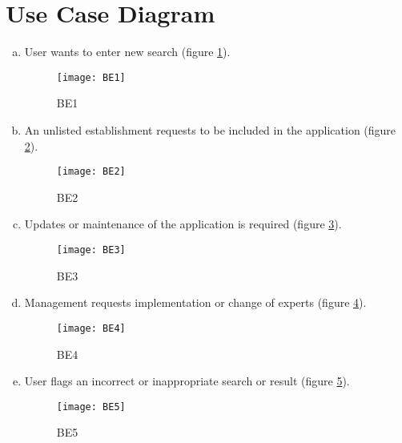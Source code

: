 \documentclass[titlepage]{article}
\begin{document}
\section{Use Case Diagram}
\label{sec:use_case_diagram}
\begin{enumerate}[a)]
	\item User wants to enter new search (figure \ref{usecase:search}).
	
	\begin{center}
		\begin{figure}[H]
			\texttt{[image: BE1]}
			\caption{BE1}\label{usecase:search}
		\end{figure}
	\end{center}

\item An unlisted establishment requests to be included in the application (figure \ref{usecase:new_esta}).
	
	\begin{center}
		\begin{figure}[H]
			\texttt{[image: BE2]}
			\caption{BE2}\label{usecase:new_esta}
		\end{figure}
	\end{center}

\item Updates or maintenance of the application is required (figure \ref{usecase:updates}).
	
		\begin{figure}[H]
			\texttt{[image: BE3]}
			\caption{BE3}\label{usecase:updates}
		\end{figure}

\item Management requests implementation or change of experts (figure \ref{usecase:change_expert}).
	
	\begin{center}
		\begin{figure}[h!]
			\texttt{[image: BE4]}
			\caption{BE4}\label{usecase:change_expert}
		\end{figure}
	\end{center}

\item User flags an incorrect or inappropriate search or result (figure \ref{usecase:badsearch}).
	
	\begin{center}
		\begin{figure}[H]
			\texttt{[image: BE5]}
			\caption{BE5}\label{usecase:badsearch}
		\end{figure}
	\end{center}
	
	\end{enumerate}
\end{document}
